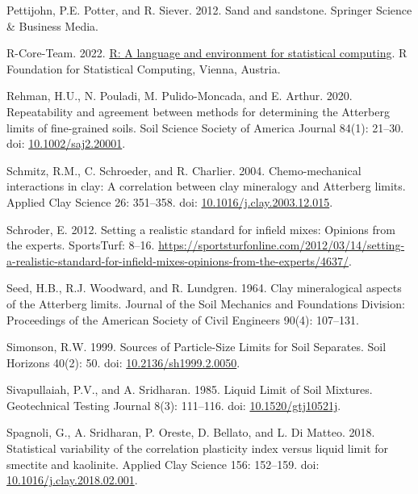 \documentclass[
  letterpaper,
]{article}
\newlength{\cslhangindent}
\newlength{\cslentryspacingunit} %
\newenvironment{CSLReferences}[2] %
 {%
  \setlength{\parindent}{0pt}
  \ifodd #1
  \let\oldpar\par
  \def\par{\hangindent=\cslhangindent\oldpar}
  \fi
  \setlength{\parskip}{#2\cslentryspacingunit}
 }%
 {}
\begin{document}
\begin{CSLReferences}{1}{0}
\leavevmode{}%
Pettijohn, P.E. Potter, and R. Siever. 2012. Sand and sandstone. {Springer Science \& Business Media}.

\leavevmode{}%
R-Core-Team. 2022. \href{https://www.r-project.org/}{R: {A} language and environment for statistical computing}. {R Foundation for Statistical Computing}, {Vienna, Austria}.

\leavevmode{}%
Rehman, H.U., N. Pouladi, M. Pulido-Moncada, and E. Arthur. 2020. Repeatability and agreement between methods for determining the {Atterberg} limits of fine-grained soils. Soil Science Society of America Journal 84(1): 21--30. doi: \href{https://doi.org/10.1002/saj2.20001}{10.1002/saj2.20001}.

\leavevmode{}%
Schmitz, R.M., C. Schroeder, and R. Charlier. 2004. Chemo-mechanical interactions in clay: {A} correlation between clay mineralogy and {Atterberg} limits. Applied Clay Science 26: 351--358. doi: \href{https://doi.org/10.1016/j.clay.2003.12.015}{10.1016/j.clay.2003.12.015}.

\leavevmode{}%
Schroder, E. 2012. Setting a realistic standard for infield mixes: Opinions from the experts. SportsTurf: 8--16. \url{https://sportsturfonline.com/2012/03/14/setting-a-realistic-standard-for-infield-mixes-opinions-from-the-experts/4637/}.

\leavevmode{}%
Seed, H.B., R.J. Woodward, and R. Lundgren. 1964. Clay mineralogical aspects of the {Atterberg} limits. Journal of the Soil Mechanics and Foundations Division: Proceedings of the American Society of Civil Engineers 90(4): 107--131.

\leavevmode{}%
Simonson, R.W. 1999. Sources of {Particle-Size Limits} for {Soil Separates}. Soil Horizons 40(2): 50. doi: \href{https://doi.org/10.2136/sh1999.2.0050}{10.2136/sh1999.2.0050}.

\leavevmode{}%
Sivapullaiah, P.V., and A. Sridharan. 1985. Liquid {Limit} of {Soil Mixtures}. Geotechnical Testing Journal 8(3): 111--116. doi: \href{https://doi.org/10.1520/gtj10521j}{10.1520/gtj10521j}.

\leavevmode{}%
Spagnoli, G., A. Sridharan, P. Oreste, D. Bellato, and L. Di Matteo. 2018. Statistical variability of the correlation plasticity index versus liquid limit for smectite and kaolinite. Applied Clay Science 156: 152--159. doi: \href{https://doi.org/10.1016/j.clay.2018.02.001}{10.1016/j.clay.2018.02.001}.


\end{CSLReferences}
\end{document}
